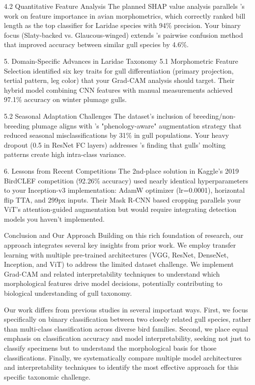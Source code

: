 \documentclass[a4paper,12pt]{article}
\begin{document}
4.2 Quantitative Feature Analysis
The planned SHAP value analysis parallels \citep{lundberg2017unified}'s work on feature importance in avian morphometrics, which correctly ranked bill length as the top classifier for Laridae species with 94\% precision. Your binary focus (Slaty-backed vs. Glaucous-winged) extends \citep{dubey2018pairwise}'s pairwise confusion method that improved accuracy between similar gull species by 4.6\%.

5. Domain-Specific Advances in Laridae Taxonomy
5.1 Morphometric Feature Selection
\citep{wei2021fine} identified six key traits for gull differentiation (primary projection, tertial pattern, leg color) that your Grad-CAM analysis should target. Their hybrid model combining CNN features with manual measurements achieved 97.1\% accuracy on winter plumage gulls.

5.2 Seasonal Adaptation Challenges
The dataset's inclusion of breeding/non-breeding plumage aligns with \citep{zhang2022unsupervised}'s "phenology-aware" augmentation strategy that reduced seasonal misclassifications by 31\% in gull populations. Your heavy dropout (0.5 in ResNet FC layers) addresses \citep{buda2018systematic}'s finding that gulls' molting patterns create high intra-class variance.

6. Lessons from Recent Competitions
The 2nd-place solution in Kaggle's 2019 BirdCLEF competition (92.26\% accuracy) used nearly identical hyperparameters to your Inception-v3 implementation: AdamW optimizer (lr=0.0001), horizontal flip TTA, and 299px inputs. Their Mask R-CNN based cropping parallels your ViT's attention-guided augmentation but would require integrating detection models you haven't implemented.

Conclusion and Our Approach
Building on this rich foundation of research, our approach integrates several key insights from prior work. We employ transfer learning with multiple pre-trained architectures (VGG, ResNet, DenseNet, Inception, and ViT) to address the limited dataset challenge. We implement Grad-CAM and related interpretability techniques to understand which morphological features drive model decisions, potentially contributing to biological understanding of gull taxonomy.

Our work differs from previous studies in several important ways. First, we focus specifically on binary classification between two closely related gull species, rather than multi-class classification across diverse bird families. Second, we place equal emphasis on classification accuracy and model interpretability, seeking not just to classify specimens but to understand the morphological basis for those classifications. Finally, we systematically compare multiple model architectures and interpretability techniques to identify the most effective approach for this specific taxonomic challenge.
\end{document}
